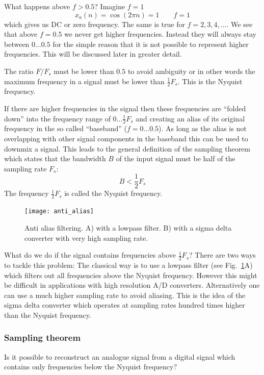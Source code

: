 \documentclass[12pt,a4paper]{article}
\begin{document}
What happens above $f>0.5$? Imagine $f = 1$
\begin{equation}
x_{a}(n) = \cos (2 \pi n) = 1 \qquad f=1
\end{equation}
which gives us DC or zero frequency. The same is true for
$f = 2, 3, 4, \ldots$. We see that above $f=0.5$ we never
get higher frequencies. Instead they will always stay between
$0\ldots 0.5$ for the simple reason that it is not possible
to represent higher frequencies. This will be discussed later
in greater detail.

The ratio $F/F_s$ must  be lower than $0.5$ to avoid ambiguity
or in other words the maximum frequency in a signal must be lower than 
$\frac{1}{2} F_s$. This is the Nyquist frequency.

If there are higher frequencies in the signal then these frequencies
are ``folded down'' into the frequency range of $0\ldots \frac{1}{2} F_s$
and creating an alias of its original frequency in the so called
``baseband'' ($f=0\ldots 0.5$). As long as the alias is not overlapping
with other signal components in the baseband this can be used to
downmix a signal. This leads to the general definition of the
sampling theorem which states that the bandwidth $B$ of the input signal
must be half of the sampling rate $F_s$:
\begin{equation}
B < \frac{1}{2}F_s
\label{samplingTheorem}
\end{equation}
The frequency $\frac{1}{2}F_s$ is called the Nyquist frequency.

\begin{figure}[!hbt]
\begin{center}
\mbox{\texttt{[image: anti\_alias]}}
\end{center}
\caption{Anti alias filtering. A) with a lowpass filter. B)
with a sigma delta converter with very high sampling rate.
\label{anti_alias}}
\end{figure}

What do we do if the signal contains frequencies above 
$\frac{1}{2} F_s$? There are two ways to tackle this problem:
The classical way is
to use a lowpass filter (see Fig.~\ref{anti_alias}A) which filters
out all frequencies above the Nyquist frequency. However this
might be difficult in applications with high resolution A/D converters.
Alternatively one can use a much higher sampling rate to avoid
aliasing. This is the idea of the sigma delta converter
which operates at sampling rates hundred times higher than the
Nyquist frequency.


\subsubsection{Sampling theorem}
Is it possible to reconstruct an analogue signal from a digital signal
which contains only frequencies below the Nyquist frequency?
\end{document}
